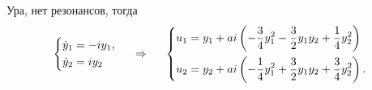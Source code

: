 Ура, нет резонансов, тогда
\begin{equation*}
    \left\{\begin{aligned}
        \dot{y}_1 &= -i y_1, \\
        \dot{y}_2 &= i y_2
    \end{aligned}\right.
    \hspace{0.5cm} \Rightarrow \hspace{0.5cm}
    \left\{\begin{aligned}
        u_1 &= y_1 + a i \left(
            -\frac{3}{4}y_1^2 - \frac{3}{2} y_1 y_2 + \frac{1}{4} y_2^2
        \right) \\
        u_2 &= y_2 + a i \left(
            - \frac{1}{4} y_1^2 + \frac{3}{2} y_1 y_2 + \frac{3}{4} y_2^2
        \right).
    \end{aligned}\right.    
\end{equation*}